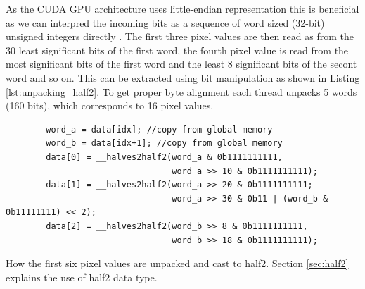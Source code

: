 As the CUDA GPU architecture uses little-endian representation this is beneficial as we can interpred the incoming bits as a sequence of word sized (32-bit) unsigned integers directly \cite[127]{CUDAProgrammingGuide}.
The first three pixel values are then read as from the 30 least significant bits of the first word, the fourth pixel value is read from the most significant bits of the first word and the least 8 significant bits of the secont word and so on.
This can be extracted using bit manipulation as shown in Listing \ref{lst:unpacking_half2}.
To get proper byte alignment each thread unpacks 5 words (160 bits), which corresponds to 16 pixel values.

\begin{listing}[H]
    \begin{verbatim}
        word_a = data[idx]; //copy from global memory
        word_b = data[idx+1]; //copy from global memory
        data[0] = __halves2half2(word_a & 0b1111111111,
                                 word_a >> 10 & 0b1111111111);
        data[1] = __halves2half2(word_a >> 20 & 0b1111111111;
                                 word_a >> 30 & 0b11 | (word_b & 0b11111111) << 2);
        data[2] = __halves2half2(word_b >> 8 & 0b1111111111,
                                 word_b >> 18 & 0b1111111111);
    \end{verbatim}
    \caption{How the first six pixel values are unpacked and cast to \gls{half2}. Section \ref{sec:half2} explains the use of \gls{half2} data type.}
    \label{lst:unpacking_half2}
\end{listing}
